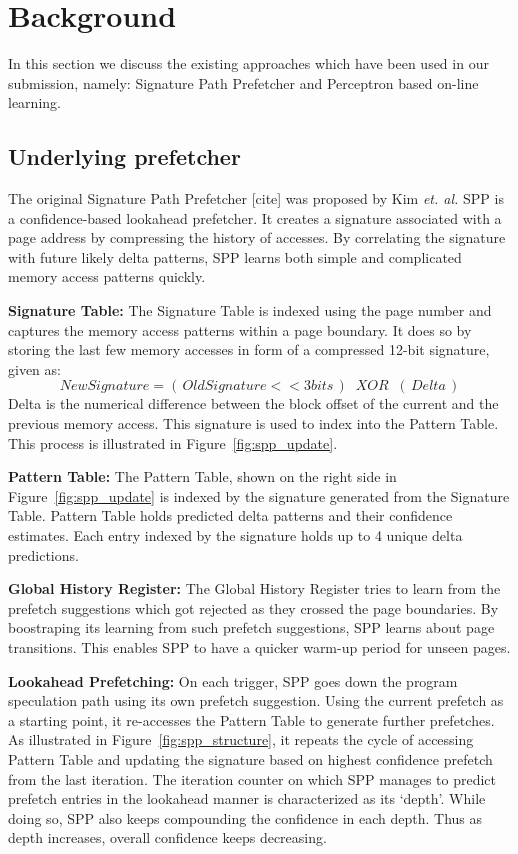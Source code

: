 \section{Background}
\label{Background}
In this section we discuss the existing approaches which have been 
used in our submission,  namely: Signature Path Prefetcher and Perceptron 
based on-line learning.

\subsection{Underlying prefetcher}
\label{sec:Background-SPP}
The original Signature Path Prefetcher [cite] was proposed by Kim 
{\em et. al.} SPP is a confidence-based lookahead prefetcher. 
It creates a signature associated with a page address by compressing 
the history of accesses. By correlating the signature with future 
likely delta patterns, SPP learns both simple and complicated 
memory access patterns quickly.

\noindent \textbf{Signature Table:} 
The Signature Table is indexed using the page number and captures the memory 
access patterns within a page boundary. It does so by storing the last few
memory accesses in form of a compressed 12-bit signature, given as:
$$New Signature = (\,Old Signature << 3 bits\,) \;\;XOR\;\; (\,Delta\,)$$ 
Delta is the numerical difference between the block offset of the current 
and the previous memory access. This signature is used to index into the 
Pattern Table. This process is illustrated in Figure~\ref{fig:spp_update}.

\noindent \textbf{Pattern Table:} 
The Pattern Table, shown on the right side in Figure~\ref{fig:spp_update} 
is indexed by the signature generated from the Signature Table. Pattern 
Table holds predicted delta patterns and their confidence estimates. Each 
entry indexed by the signature holds up to 4 unique delta predictions.

\noindent \textbf{Global History Register:} 
The Global History Register tries to learn from the prefetch suggestions which
got rejected as they crossed the page boundaries. By boostraping its learning
from such prefetch suggestions, SPP learns about page transitions. This enables 
SPP to have a quicker warm-up period for unseen pages. 

\noindent \textbf{Lookahead Prefetching:} On each trigger, SPP goes
down the program speculation path using its own prefetch suggestion.
Using the current prefetch as a starting point, it re-accesses the Pattern
Table to generate further prefetches.  As illustrated in
Figure~\ref{fig:spp_structure}, it repeats the cycle of accessing
Pattern Table and updating the signature based on highest confidence
prefetch from the last iteration.  The iteration counter on which SPP
manages to predict prefetch entries in the lookahead manner is
characterized as its `depth'. While doing so, SPP also keeps
compounding the confidence in each depth. Thus as depth increases,
overall confidence keeps decreasing.

